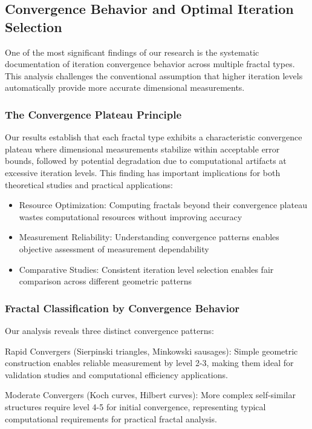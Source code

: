 \documentclass[preprint,12pt]{elsarticle}
\def\textbf#1{#1}%
\begin{document}
\subsection{Convergence Behavior and Optimal Iteration Selection}

One of the most significant findings of our research is the systematic documentation of iteration convergence behavior across multiple fractal types. This analysis challenges the conventional assumption that higher iteration levels automatically provide more accurate dimensional measurements.

\subsubsection{The Convergence Plateau Principle}

Our results establish that each fractal type exhibits a characteristic convergence plateau where dimensional measurements stabilize within acceptable error bounds, followed by potential degradation due to computational artifacts at excessive iteration levels. This finding has important implications for both theoretical studies and practical applications:

\begin{itemize}
\item \textbf{Resource Optimization}: Computing fractals beyond their convergence plateau wastes computational resources without improving accuracy
\item \textbf{Measurement Reliability}: Understanding convergence patterns enables objective assessment of measurement dependability
\item \textbf{Comparative Studies}: Consistent iteration level selection enables fair comparison across different geometric patterns
\end{itemize}

\subsubsection{Fractal Classification by Convergence Behavior}

Our analysis reveals three distinct convergence patterns:

\textbf{Rapid Convergers} (Sierpinski triangles, Minkowski sausages): Simple geometric construction enables reliable measurement by level 2-3, making them ideal for validation studies and computational efficiency applications.

\textbf{Moderate Convergers} (Koch curves, Hilbert curves): More complex self-similar structures require level 4-5 for initial convergence, representing typical computational requirements for practical fractal analysis.
\end{document}

